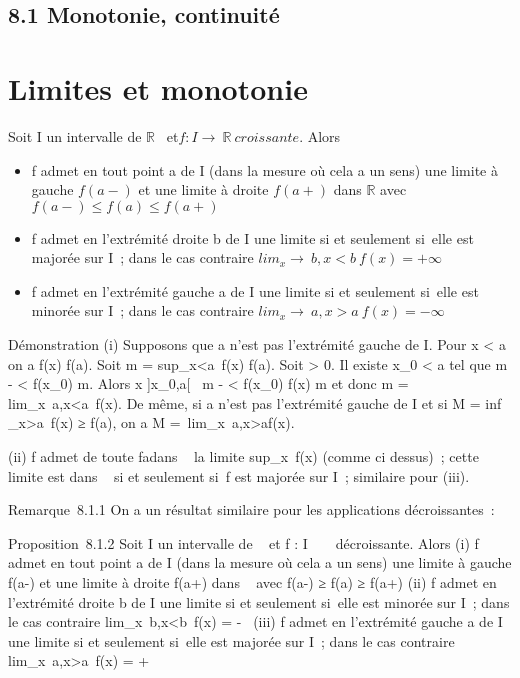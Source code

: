 \subsection{8.1 Monotonie, continuité}

\section{Limites et monotonie}
\label{sec:limites-et-monotonie}



\begin{prop}
Soit I un intervalle de $\mathbb{R}$~ et$ f : I \rightarrow~ \mathbb{R}~ croissante$.
Alors

\begin{itemize}

\item
f admet en tout point a de I (dans la mesure où cela a un sens)
  une limite à gauche $f(a-)$ et une limite à droite $ f(a+)$ dans $\mathbb{R}$ avec
  $f(a-) \leq f(a) \leq f(a+)$
\item
f admet en l'extrémité droite b de I une limite si et seulement
  si~elle est majorée sur I~; dans le cas contraire
 $ lim_x\rightarrow~b,x<b~f(x) = +\infty~$
\item
f admet en l'extrémité gauche a de I une limite si et seulement
  si~elle est minorée sur I~; dans le cas contraire
$lim_x \rightarrow ~a, x >a~f(x) = -\infty~$
\end{itemize}
  
\end{prop}

Démonstration (i) Supposons que a n'est pas l'extrémité gauche de I.
Pour x < a on a f(x) \leq f(a). Soit m
= sup_x<a~f(x) \leq f(a). Soit
\epsilon > 0. Il existe x_0 < a tel que m - \epsilon
< f(x_0) \leq m. Alors x \in]x_0,a[\rigtharrow~ m - \epsilon
< f(x_0) \leq f(x) \leq m et donc m
= lim_x\rightarrow~a,x<a~f(x). De même,
si a n'est pas l'extrémité gauche de I et si M
= inf _x>a~f(x) ≥ f(a),
on a M =\
lim_x\rightarrow~a,x>af(x).

(ii) f admet de toute fa\ccon dans
\overline{}~ la limite
sup_x\inI~f(x) (comme ci dessus)~; cette
limite est dans \mathbb{R}~ si et seulement si~f est majorée sur I~; similaire
pour (iii).

Remarque~8.1.1 On a un résultat similaire pour les applications
décroissantes~:

Proposition~8.1.2 Soit I un intervalle de ~ et f : I \rightarrow~ ~ décroissante.
Alors (i) f admet en tout point a de I (dans la mesure où cela a un
sens) une limite à gauche f(a-) et une limite à droite f(a+) dans ~ avec
f(a-) ≥ f(a) ≥ f(a+) (ii) f admet en l'extrémité droite b de I une
limite si et seulement si~elle est minorée sur I~; dans le cas contraire
lim_x\rightarrow~b,x<b~f(x) = -\infty~ (iii)
f admet en l'extrémité gauche a de I une limite si et seulement si~elle
est majorée sur I~; dans le cas contraire
lim_x\rightarrow~a,x>a~f(x) = +\infty~

